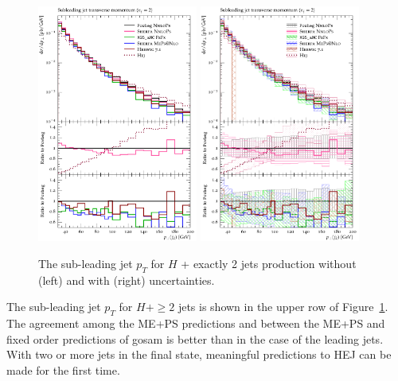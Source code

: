 \begin{figure}[t!]
  \centering
  \includegraphics[width=0.47\textwidth]{figures/hjetscomp_u_jet2_pT_excl.pdf}
  \hfill
  \includegraphics[width=0.47\textwidth]{figures/hjetscomp_jet2_pT_excl.pdf}
  \caption{
    The sub-leading jet $p_T$ for $H$ + exactly 2 jets production without
    (left) and with (right) uncertainties.
    \label{fig:hjetscomp:results:2obs:jet2_pt}
  }
\end{figure}

The sub-leading jet $p_T$ for $H+\ge2$ jets is shown in the upper row
of Figure~\ref{fig:hjetscomp:results:2obs:jet2_pt}.  The agreement
among the ME+PS predictions and between the ME+PS and fixed order
predictions of gosam is better than in the case of the leading
jets. With two or more jets in the final state, meaningful predictions
to HEJ can be made for the first time.

